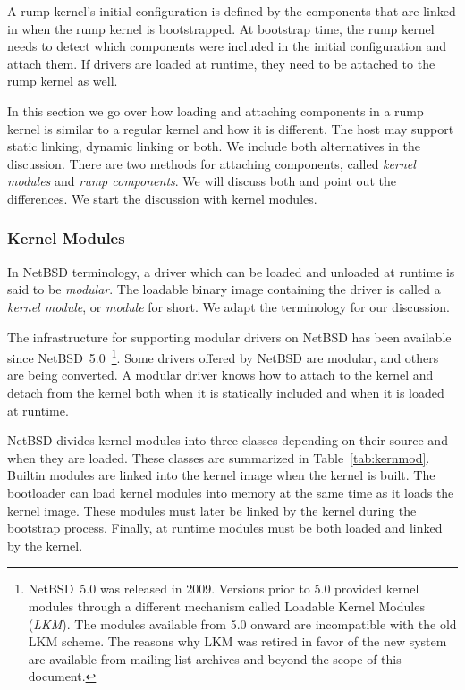 A rump kernel's initial configuration is defined by the components that
are linked in when the rump kernel is bootstrapped.  At bootstrap time,
the rump kernel needs to detect which components were included in the
initial configuration and attach them.  If drivers are loaded at runtime,
they need to be attached to the rump kernel as well.

In this section we go over how loading and attaching components in
a rump kernel is similar to a regular kernel and how it is different.
The host may support static linking, dynamic linking or both.  We include
both alternatives in the discussion.  There are two methods for attaching
components, called \textit{kernel modules} and \textit{rump components}.
We will discuss both and point out the differences.  We start the
discussion with kernel modules.

\subsubsection{Kernel Modules}
\label{sect:extending}

In NetBSD terminology, a driver which can be loaded and unloaded
at runtime is said to be \textit{modular}.  The loadable binary
image containing the driver is called a \textit{kernel module}, or
\textit{module} for short.  We adapt the terminology for our
discussion.

The infrastructure for supporting modular drivers on NetBSD has
been available since NetBSD~5.0~\footnote
{
	NetBSD~5.0 was released in 2009.  Versions prior to 5.0
	provided kernel modules through a different mechanism called
	Loadable Kernel Modules (\textit{LKM}).  The modules
	available from 5.0 onward are incompatible with the old
	LKM scheme.  The reasons why LKM was retired in favor of
	the new system are available from mailing list archives
	and beyond the scope of this document.
}.
Some drivers offered by NetBSD are modular, and others are being
converted.  A modular driver knows how to attach to the kernel and detach
from the kernel both when it is statically included and when it is loaded
at runtime.

NetBSD divides kernel modules into three classes depending on their
source and when they are loaded.  These classes are summarized in
Table~\ref{tab:kernmod}.  Builtin modules are linked into the kernel
image when the kernel is built.  The bootloader can load kernel modules
into memory at the same time as it loads the kernel image.  These modules
must later be linked by the kernel during the bootstrap process.  Finally,
at runtime modules must be both loaded and linked by the kernel.

